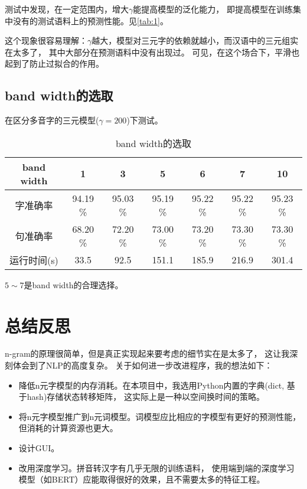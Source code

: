 \documentclass[12pt, UTF8, a4paper]{ctexart}
\begin{document}
测试中发现，在一定范围内，增大$\gamma$能提高模型的泛化能力，
即提高模型在训练集中没有的测试语料上的预测性能。见\ref{tab:1}。

这个现象很容易理解：$\gamma$越大，模型对三元字的依赖就越小，而汉语中的三元组实在太多了，
其中大部分在预测语料中没有出现过。
可见，在这个场合下，平滑也起到了防止过拟合的作用。

\subsection{band width的选取}

在区分多音字的三元模型($\gamma = 200$)下测试。

\begin{table}[htbp] 
    \caption{\label{tab:6}band width的选取}
    \centering
    \begin{tabular}{ccccccc} 
     \toprule 
     band width         & 1       & 3       & 5       & 6       & 7       & 10\\
    \midrule
     字准确率 & 94.19 \% & 95.03 \% & 95.19 \% & 95.22 \% & 95.22 \% & 95.23 \% \\
     句准确率 & 68.20 \% & 72.20 \% & 73.00 \% & 73.20 \% & 73.30 \% & 73.30 \%\\
     运行时间(s) & 33.5    & 92.5    & 151.1   & 185.9   & 216.9   & 301.4 \\
     \bottomrule 
    \end{tabular}
\end{table}

$5\sim 7$是band width的合理选择。

\section{总结反思}

n-gram的原理很简单，但是真正实现起来要考虑的细节实在是太多了，
这让我深刻体会到了NLP的高度复杂。
关于如何进一步改进程序，我的想法如下：

\begin{itemize}
    \item 降低n元字模型的内存消耗。在本项目中，我选用Python内置的字典(dict, 基于hash)存储状态转移矩阵，
    这实际上是一种以空间换时间的策略。
    \item 将n元字模型推广到n元词模型。词模型应比相应的字模型有更好的预测性能，但消耗的计算资源也更大。
    \item 设计GUI。
    \item 改用深度学习。拼音转汉字有几乎无限的训练语料，
    使用端到端的深度学习模型（如BERT）应能取得很好的效果，且不需要太多的特征工程。
\end{itemize}
\end{document}
